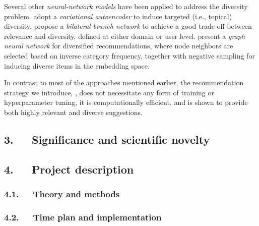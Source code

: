 \documentclass[a4paper,11pt]{article}
\begin{document}
Several other \emph{neural-network models} have been applied to address the diversity problem. 
\citet{diversification_vae_based} adopt a \emph{variational auto\-encoder} to induce targeted (i.e., topical) diversity. 
\citet{enhancing_adaptivity} propose a \emph{bilateral branch network} to achieve a good trade-off between relevance and diversity, defined at either domain or user level. 
\citet{dgcn} present a \emph{graph neural network} for diversified recommendations, 
where node neighbors are selected based on inverse category frequency, 
together with negative sampling for inducing diverse items in the embedding space.



In contrast to most of the approaches mentioned earlier, the recommendation strategy we introduce, \acronym, does not necessitate any form of training or hyperparameter tuning, it is computationally efficient, and is shown to provide both highly relevant and diverse suggestions.








\subsection*{3.~~~Significance and scientific novelty}

\subsection*{4.~~~Project description}


\subsubsection*{4.1.~~~Theory and methods}

\subsubsection*{4.2.~~~Time plan and implementation}
\end{document}
